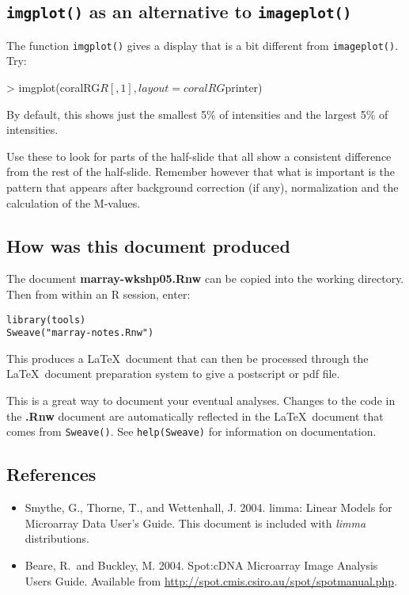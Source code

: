 \documentclass[a4paper,9pt]{article}
\begin{document}
\subsection{\texttt{imgplot()} as an alternative to 
\texttt{imageplot()}}

The function \texttt{imgplot()} gives a display that is a bit
different from \texttt{imageplot()}. Try:
\begin{Schunk}
\begin{Sinput}
> imgplot(coralRG$R[, 1], layout = coralRG$printer)
\end{Sinput}
\end{Schunk}
By default, this shows just the smallest 5\% of intensities and the
largest 5\% of intensities.
 
Use these to look for parts of the half-slide that all show a
consistent difference from the rest of the half-slide.
Remember however that what is important is the pattern 
that appears after background correction (if any),
normalization and the calculation of the M-values.


\subsection*{How was this document produced}
The document \textbf{marray-wkshp05.Rnw} can be copied into the
working directory.  Then from within an R session, enter:
\begin{verbatim}
library(tools)
Sweave("marray-notes.Rnw")
\end{verbatim}
This produces a \LaTeX\ document that can then be processed through the
\LaTeX\ document preparation system to give a postscript or pdf file.

This is a great way to document your eventual analyses.  Changes to
the code in the \textbf{.Rnw} document are automatically reflected
in the \LaTeX\ document that comes from \texttt{Sweave()}.
See \texttt{help(Sweave)} for information on documentation.

\subsection*{References}
\begin{itemize}
\item[] Smythe, G., Thorne, T., and Wettenhall, J. 2004. limma: Linear
Models for Microarray Data User's Guide.  This document is included
with \textit{limma} distributions.
\item[] Beare, R.\ and Buckley, M. 2004. Spot:cDNA Microarray Image
Analysis Users Guide.  
Available from \url{http://spot.cmis.csiro.au/spot/spotmanual.php}.
\end{itemize}
\end{document}

